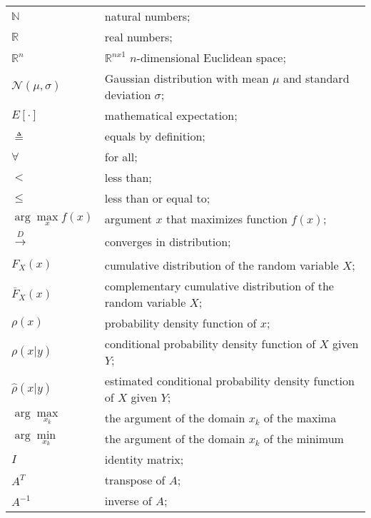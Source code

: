 \begin{longtable}{ll}
	$\mathbb{N}$			& natural numbers; \\
	$\mathbb{R}$ 			& real numbers; \\
	$\mathbb{R}^n$			& $\mathbb{R}^{nx1}$ $n$-dimensional Euclidean space; \\
	
	$\mathcal{N}(\mu,\sigma)$ & Gaussian distribution with mean $\mu$ and standard deviation $\sigma$; \\
	$E[\mathord{\cdot}]$	& mathematical expectation; \\
	
	$\triangleq$			& equals by definition; \\	
	$\forall$				& for all; \\
	$<$						& less than; \\
	$\leq$					& less than or equal to; \\
	$\operatorname{arg}  
	\underset{x}
	{\operatorname{max}} 
					f(x)$	& argument $x$ that maximizes function $f(x)$; \\ 
	$\xrightarrow[]{D}$		& converges in distribution; \\
	$F_X(x)$				& cumulative distribution of the random variable $X$; \\
	$\bar{F}_X(x)$			& complementary cumulative distribution of the random variable $X$; \\
	$\rho(x)$				& probability density function of $x$; \\
	$\rho(x|y)$				& conditional probability density function of $X$ given $Y$; \\
	$\hat{\rho}(x|y)$		& estimated conditional probability density function of $X$ given $Y$; \\
	
	$\operatorname{arg}  \underset{x_k}{\operatorname{max}}$ & the argument of the domain $x_k$ of the maxima \\
	$\operatorname{arg}  \underset{x_k}{\operatorname{min}}$ & the argument of the domain $x_k$ of the minimum \\
 
	$I$						& identity matrix; \\
	$A^T$					& transpose of $A$; \\
	$A^{-1}$				& inverse of $A$; \\
	

\end{longtable}

